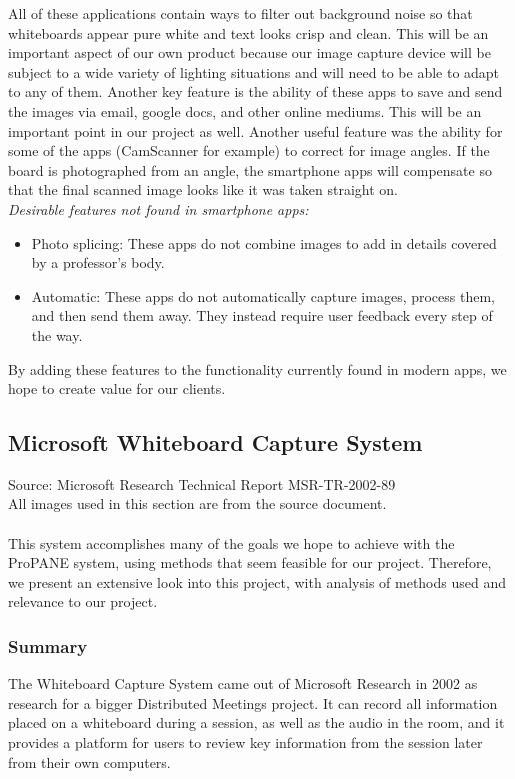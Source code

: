 \documentclass{article}
\begin{document}
All of these applications contain ways to filter out background noise so that whiteboards appear pure white and text looks crisp and clean. This will be an important aspect of our own product because our image capture device will be subject to a wide variety of lighting situations and will need to be able to adapt to any of them.
Another key feature is the ability of these apps to save and send the images via email, google docs, and other online mediums. This will be an important point in our project as well.
Another useful feature was the ability for some of the apps (CamScanner for example) to correct for image angles. If the board is photographed from an angle, the smartphone apps will compensate so that the final scanned image looks like it was taken straight on. \\

        \emph{Desirable features not found in smartphone apps:}
        \begin{itemize} \itemsep -2pt
            \item Photo splicing: These apps do not combine images to add in details covered by a professor's body.
            \item Automatic: These apps do not automatically capture images, process them, and then send them away. They instead require user feedback every step of the way.
        \end{itemize}

By adding these features to the functionality currently found in modern apps, we hope to create value for our clients.


			\subsection*{Microsoft Whiteboard Capture System}
Source: Microsoft Research Technical Report MSR-TR-2002-89 \cite{WCS} \\
All images used in this section are from the source document. \\ \\
This system accomplishes many of the goals we hope to achieve with the ProPANE system, using methods that seem feasible for our project.  Therefore, we present an extensive look into this project, with analysis of methods used and relevance to our project.
		\subsubsection*{Summary}
The Whiteboard Capture System came out of Microsoft Research in 2002 as research for a bigger Distributed Meetings project.  It can record all information placed on a whiteboard during a session, as well as the audio in the room, and it provides a platform for users to review key information from the session later from their own computers.  
	
\end{document}

